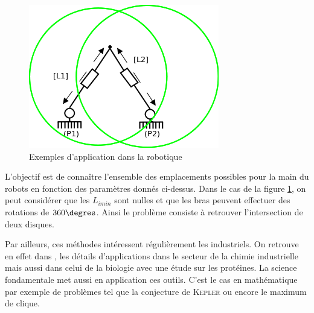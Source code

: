 \begin{figure}[h] %
  \center
\includegraphics[scale=0.80]{img/robot2}
  \caption{Exemples d'application dans la robotique} %
 \label{fig:rob} %
\end{figure} %
L'objectif est de connaître l'ensemble des emplacements possibles pour la main du robots en fonction des paramètres donnés ci-dessus. Dans le cas de la figure \ref{fig:rob}, on peut considérer que les $L_{imin}$ sont nulles et que les bras peuvent effectuer des rotations de $360 \degres$. Ainsi le problème consiste à retrouver l'intersection de deux disques. 

  Par ailleurs, ces méthodes intéressent régulièrement les industriels. On retrouve en effet dans \cite{Schichl}, les détails d'applications dans le secteur de la chimie industrielle mais aussi dans celui de la biologie avec une étude sur les protéines. La science fondamentale met aussi en application ces outils. C'est le cas en mathématique par exemple de problèmes tel que la conjecture de \textsc{Kepler} ou encore le  maximum de clique.

\clearpage
